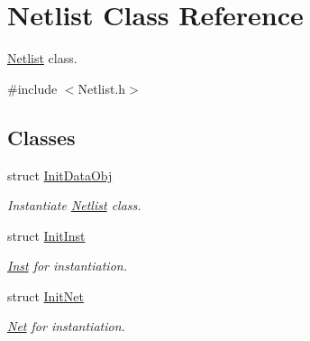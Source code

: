 \hypertarget{classNetlist}{}\section{Netlist Class Reference}
\label{classNetlist}


\hyperlink{classNetlist}{Netlist} class.  




{\ttfamily \#include $<$Netlist.\+h$>$}

\subsection*{Classes}
\begin{DoxyCompactItemize}
\item 
struct \hyperlink{structNetlist_1_1InitDataObj}{Init\+Data\+Obj}
\begin{DoxyCompactList}\small\item\em Instantiate \hyperlink{classNetlist}{Netlist} class. \end{DoxyCompactList}\item 
struct \hyperlink{structNetlist_1_1InitInst}{Init\+Inst}
\begin{DoxyCompactList}\small\item\em \hyperlink{classInst}{Inst} for instantiation. \end{DoxyCompactList}\item 
struct \hyperlink{structNetlist_1_1InitNet}{Init\+Net}
\begin{DoxyCompactList}\small\item\em \hyperlink{classNet}{Net} for instantiation. \end{DoxyCompactList}\end{DoxyCompactItemize}
